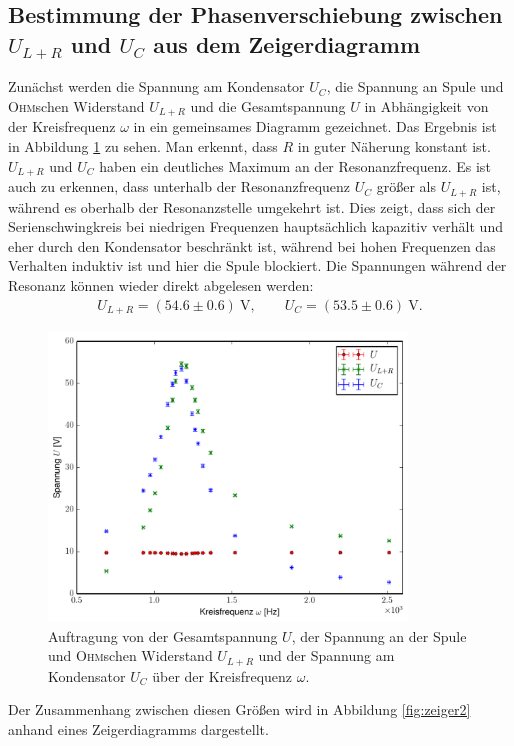 \documentclass[12pt,a4paper,titlepage,headinclude]{scrartcl}
\numberwithin{equation}{subsection}
\newcommand{\mrm}[1]{\mathrm{#1}}
\newcommand{\person}[1]{\textsc{#1}}
\begin{document}
\subsection{Bestimmung der Phasenverschiebung zwischen $U_{L+R}$ und $U_C$ aus dem Zeigerdiagramm}
\label{sec:zeiger}
Zunächst werden die Spannung am Kondensator $U_C$, die Spannung an Spule und \person{Ohm}schen Widerstand $U_{L+R}$ und die Gesamtspannung $U$ in Abhängigkeit von der Kreisfrequenz $\omega$ in ein gemeinsames Diagramm gezeichnet. Das Ergebnis ist in Abbildung \ref{fig:plot4} zu sehen. Man erkennt, dass $R$ in guter Näherung konstant ist. $U_{L+R}$ und $U_C$ haben ein deutliches Maximum an der Resonanzfrequenz. Es ist auch zu erkennen, dass unterhalb der Resonanzfrequenz $U_C$ größer als $U_{L+R}$ ist, während es oberhalb der Resonanzstelle umgekehrt ist. Dies zeigt, dass sich der Serienschwingkreis bei niedrigen Frequenzen hauptsächlich kapazitiv verhält und eher durch den Kondensator beschränkt ist, während bei hohen Frequenzen das Verhalten induktiv ist und hier die Spule blockiert. Die Spannungen während der Resonanz können wieder direkt abgelesen werden:
\begin{align}
	U_{L+R}=(54.6\pm0.6)~\mrm V,\qquad U_{C}=(53.5\pm0.6)~\mrm V.
	\label{eq:spannungen}
\end{align}
\begin{figure}[h!]
	\centering
	\includegraphics[width=0.85\textwidth]{plot4.pdf}
	\caption{Auftragung von der Gesamtspannung $U$, der Spannung an der Spule und \person{Ohm}schen Widerstand $U_{L+R}$ und der Spannung am Kondensator $U_C$ über der Kreisfrequenz $\omega.$} \label{fig:plot4}
\end{figure}
Der Zusammenhang zwischen diesen Größen wird in Abbildung \ref{fig:zeiger2} anhand eines Zeigerdiagramms  dargestellt.
\end{document}
